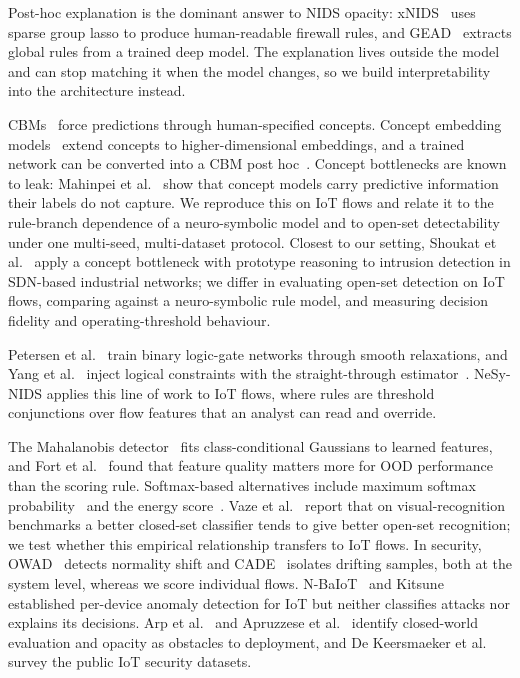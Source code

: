 \documentclass[journal]{IEEEtran}
\begin{document}
Post-hoc explanation is the dominant answer to NIDS opacity: xNIDS~\cite{wei2023xnids} uses sparse group lasso to produce human-readable firewall rules, and GEAD~\cite{han2024gead} extracts global rules from a trained deep model. The explanation lives outside the model and can stop matching it when the model changes, so we build interpretability into the architecture instead.

CBMs~\cite{koh2020concept} force predictions through human-specified concepts. Concept embedding models~\cite{zarlenga2022concept} extend concepts to higher-dimensional embeddings, and a trained network can be converted into a CBM post hoc~\cite{yuksekgonul2023posthoc}. Concept bottlenecks are known to leak: Mahinpei et al.~\cite{mahinpei2021promises} show that concept models carry predictive information their labels do not capture. We reproduce this on IoT flows and relate it to the rule-branch dependence of a neuro-symbolic model and to open-set detectability under one multi-seed, multi-dataset protocol. Closest to our setting, Shoukat et al.~\cite{shoukat2026concept} apply a concept bottleneck with prototype reasoning to intrusion detection in SDN-based industrial networks; we differ in evaluating open-set detection on IoT flows, comparing against a neuro-symbolic rule model, and measuring decision fidelity and operating-threshold behaviour.

Petersen et al.~\cite{petersen2022logic} train binary logic-gate networks through smooth relaxations, and Yang et al.~\cite{yang2022ste} inject logical constraints with the straight-through estimator~\cite{bengio2013ste}. NeSy-NIDS applies this line of work to IoT flows, where rules are threshold conjunctions over flow features that an analyst can read and override.

The Mahalanobis detector~\cite{lee2018simple} fits class-conditional Gaussians to learned features, and Fort et al.~\cite{fort2021exploring} found that feature quality matters more for OOD performance than the scoring rule. Softmax-based alternatives include maximum softmax probability~\cite{hendrycks2017baseline} and the energy score~\cite{liu2020energy}. Vaze et al.~\cite{vaze2022openset} report that on visual-recognition benchmarks a better closed-set classifier tends to give better open-set recognition; we test whether this empirical relationship transfers to IoT flows. In security, OWAD~\cite{han2023owad} detects normality shift and CADE~\cite{yang2021cade} isolates drifting samples, both at the system level, whereas we score individual flows. N-BaIoT~\cite{meidan2018nbaiot} and Kitsune~\cite{mirsky2018kitsune} established per-device anomaly detection for IoT but neither classifies attacks nor explains its decisions. Arp et al.~\cite{arp2022dos} and Apruzzese et al.~\cite{apruzzese2022ml} identify closed-world evaluation and opacity as obstacles to deployment, and De Keersmaeker et al.~\cite{dekeersmaeker2023survey} survey the public IoT security datasets.
\end{document}
